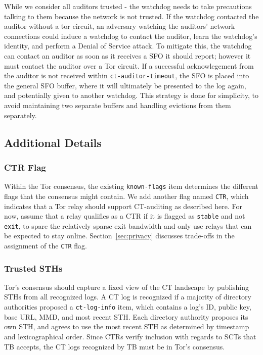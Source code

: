 While we consider all auditors trusted - the watchdog needs to take precautions talking to them because the network is not trusted. If the watchdog contacted the auditor without a tor circuit, an adversary watching the auditors' network connections could induce a watchdog to contact the auditor, learn the watchdog's identity, and perform a Denial of Service attack. To mitigate this, the watchdog can contact an auditor as soon as it receives a SFO it should report; however it must contact the auditor over a Tor circuit. If a successful acknowlegement from the auditor is not received within \texttt{ct-auditor-timeout}, the SFO is placed into the general SFO buffer, where it will ultimately be presented to the log again, and potentially given to another watchdog. This strategy is done for simplicity, to avoid maintaining two separate buffers and handling evictions from them separately.

\subsection{Additional Details}

\subsubsection{CTR Flag} \label{sec:base:consensus:ctr-flag}
Within the Tor consensus, the existing \texttt{known-flags} item determines the
different flags that the consensus might contain.  We add another flag named
\texttt{CTR}, which indicates that a Tor relay should support CT-auditing as
described here. For now, assume that a relay qualifies as a CTR if it is flagged
as \texttt{stable} and not \texttt{exit}, to spare the relatively sparse exit
bandwidth and only use relays that can be expected to stay online.
Section~\ref{sec:privacy} discusses trade-offs in the assignment of the
\texttt{CTR} flag.

\subsubsection{Trusted STHs}
Tor's consensus should capture a fixed view of the CT landscape by publishing
STHs from all recognized logs.  A CT log is recognized if a majority of directory
authorities proposed a \texttt{ct-log-info} item, which contains a log's ID,
public key, base URL, MMD, and most recent STH.  Each directory authority
proposes its own STH, and agrees to use the most recent STH as determined by
timestamp and lexicographical order.  Since CTRs verify inclusion with regards
to SCTs that TB accepts, the CT logs recognized by TB must be
in Tor's consensus.

